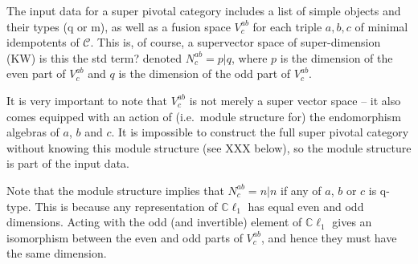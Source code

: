 \documentclass[12pt,a4paper]{article}
\newcommand{\mcc}{\mathcal{C}}
\newcommand{\cl}{\mathbb{C}\ell}
\newcommand{\kw}[1]{{\color{kwcolor}\footnotesize{(KW) #1}}}
\begin{document}
The input data for a super pivotal category includes a list of simple objects and their types (q or m), as well as a fusion space $V^{ab}_c$ for each triple $a,b,c$ of minimal idempotents
of $\mcc$.
This is, of course, a supervector space of super-dimension \kw{is this the std term?} 
denoted $N^{ab}_c = p|q$, where $p$ is the dimension of the even part
of $V^{ab}_c$ and $q$ is the dimension of the odd part of $V^{ab}_c$.

It is very important to note that $V^{ab}_c$ is not merely a super vector space -- it also comes equipped with an action
of (i.e.\ module structure for) the endomorphism algebras of $a$, $b$ and $c$.
It is impossible to construct the full super pivotal category without knowing this module structure (see XXX below), 
so the module
structure is part of the input data.

Note that the module structure implies that $N^{ab}_c = n|n$ if any of $a$, $b$ or $c$ is q-type.
This is because any representation of $\cl_1$ has equal even and odd dimensions.
Acting with the odd (and invertible) element of $\cl_1$ gives an isomorphism between the even and odd parts of $V^{ab}_c$, and hence they must have the same dimension.
\end{document}

